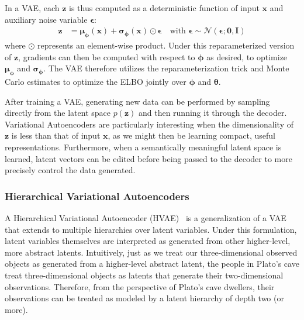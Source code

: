 In a VAE, each $\bm{z}$ is thus computed as a deterministic function of input $\bm{x}$ and auxiliary noise variable $\bm{\epsilon}$:
\begin{align*}
    \bm{z} &= \bm{\mu}_{\bm{\phi}}(\bm{x}) + \bm{\sigma}_{\bm{\phi}}(\bm{x})\odot\bm{\epsilon} \quad \text{with } \bm{\epsilon} \sim \mathcal{N}(\bm{\epsilon};\bm{0}, \textbf{I})
\end{align*}
where $\odot$ represents an element-wise product.  Under this reparameterized version of $\bm{z}$, gradients can then be computed with respect to $\bm{\phi}$ as desired, to optimize $\bm{\mu}_{\bm{\phi}}$ and $\bm{\sigma}_{\bm{\phi}}$.  The VAE therefore utilizes the reparameterization trick and Monte Carlo estimates to optimize the ELBO jointly over $\bm{\phi}$ and $\bm{\theta}$.

After training a VAE, generating new data can be performed by sampling directly from the latent space $p(\bm{z})$ and then running it through the decoder.  Variational Autoencoders are particularly interesting when the dimensionality of $\bm{z}$ is less than that of input $\bm{x}$, as we might then be learning compact, useful representations.  Furthermore, when a semantically meaningful latent space is learned, latent vectors can be edited before being passed to the decoder to more precisely control the data generated.

\subsubsection*{Hierarchical Variational Autoencoders}
%
A Hierarchical Variational Autoencoder (HVAE)~\cite{kingma2016improved, sonderby2016ladder} is a generalization of a VAE that extends to multiple hierarchies over latent variables.  Under this formulation, latent variables themselves are interpreted as generated from other higher-level, more abstract latents. Intuitively, just as we treat our three-dimensional observed objects as generated from a higher-level abstract latent, the people in Plato's cave treat three-dimensional objects as latents that generate their two-dimensional observations.  Therefore, from the perspective of Plato's cave dwellers, their observations can be treated as modeled by a latent hierarchy of depth two (or more).

